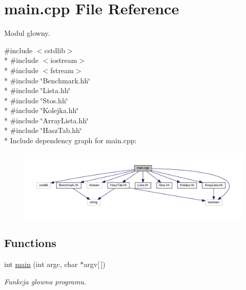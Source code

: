\hypertarget{a00017}{}\section{main.\+cpp File Reference}
\label{a00017}


Modul glowny.  


{\ttfamily \#include $<$cstdlib$>$}\\*
{\ttfamily \#include $<$iostream$>$}\\*
{\ttfamily \#include $<$fstream$>$}\\*
{\ttfamily \#include \char`\"{}Benchmark.\+hh\char`\"{}}\\*
{\ttfamily \#include \char`\"{}Lista.\+hh\char`\"{}}\\*
{\ttfamily \#include \char`\"{}Stos.\+hh\char`\"{}}\\*
{\ttfamily \#include \char`\"{}Kolejka.\+hh\char`\"{}}\\*
{\ttfamily \#include \char`\"{}Array\+Lista.\+hh\char`\"{}}\\*
{\ttfamily \#include \char`\"{}Hasz\+Tab.\+hh\char`\"{}}\\*
Include dependency graph for main.\+cpp\+:\nopagebreak
\begin{figure}[H]
\begin{center}
\leavevmode
\includegraphics[width=350pt]{a00035}
\end{center}
\end{figure}
\subsection*{Functions}
\begin{DoxyCompactItemize}
\item 
int \hyperlink{a00017_a0ddf1224851353fc92bfbff6f499fa97}{main} (int argc, char $\ast$argv\mbox{[}$\,$\mbox{]})
\begin{DoxyCompactList}\small\item\em Funkcja glowna programu. \end{DoxyCompactList}\end{DoxyCompactItemize}


